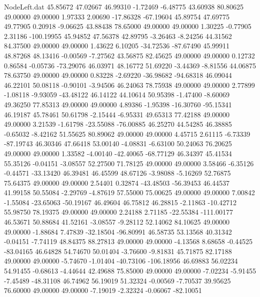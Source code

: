 \begin{filecontents}{NodeLeft.dat}
  45.85672   47.02667   46.99310    -1.72469   -6.48775   43.60938   80.80625   49.00000   49.00000    1.97333    2.00690  -17.86328  -67.19604
  45.89754   47.69775   49.77905     0.20918   -9.06625   43.88438   78.65000   49.00000   49.00000    1.30225   -0.77905    2.31186 -100.19955
  45.94852   47.56378   42.89795    -3.26463   -8.24256   44.31562   84.37500   49.00000   49.00000    1.43622    6.10205  -34.72536  -87.67490
  45.99911   48.87268   48.13416    -0.00569   -7.27562   43.56875   82.45625   49.00000   49.00000    0.12732    0.86584   -0.05736  -73.29076
  46.03971   48.16772   51.69220    -3.44369   -8.81556   44.06875   78.63750   49.00000   49.00000    0.83228   -2.69220  -36.98682  -94.68318
  46.09044   46.22101   50.08118    -0.90101   -3.94506   46.24063   78.75938   49.00000   49.00000    2.77899   -1.08118   -9.93059  -43.48122
  46.14122   44.10614   50.95398    -1.47400   -8.60069   49.36250   77.85313   49.00000   49.00000    4.89386   -1.95398  -16.30760  -95.15341
  46.19187   45.78461   50.61798    -2.15444   -6.95331   49.65313   77.42188   49.00000   49.00000    3.21539   -1.61798  -23.55088  -76.00885
  46.25270   44.54285   46.38885    -0.65032   -8.42162   51.55625   80.89062   49.00000   49.00000    4.45715    2.61115   -6.73339  -87.19743
  46.30346   47.66418   53.00140    -4.08831   -6.63100   50.24063   76.20625   49.00000   49.00000    1.33582   -4.00140  -42.40065  -68.77129
  46.34397   45.41534   55.35126    -0.04151   -3.08557   52.27500   71.78125   49.00000   49.00000    3.58466   -6.35126   -0.44571  -33.13420
  46.39481   46.45599   48.67126    -3.98088   -5.16269   52.76875   75.64375   49.00000   49.00000    2.54401    0.32874  -43.48503  -56.39453
  46.44537   41.99158   50.55084    -2.29769   -4.87619   57.55000   75.00625   49.00000   49.00000    7.00842   -1.55084  -23.65063  -50.19167
  46.49604   46.75812   46.28815    -2.11863  -10.42712   55.98750   78.19375   49.00000   49.00000    2.24188    2.71185  -22.55384 -111.00177
  46.53671   50.88684   41.52161    -3.08557   -9.28112   52.14062   84.10625   49.00000   49.00000   -1.88684    7.47839  -32.18504  -96.80991
  46.58735   53.13568   40.31342    -0.04151   -7.74119   48.84375   88.27813   49.00000   49.00000   -4.13568    8.68658   -0.44525  -83.04165
  46.64828   54.74670   50.01404    -3.76600   -9.81831   45.71875   82.17188   49.00000   49.00000   -5.74670   -1.01404  -40.73106 -106.18956
  46.69883   56.02234   54.91455    -0.68613   -4.44644   42.49688   75.85000   49.00000   49.00000   -7.02234   -5.91455   -7.45489  -48.31108
  46.74962   56.19019   51.32324    -0.00569   -7.70537   39.95625   76.60000   49.00000   49.00000   -7.19019   -2.32324   -0.06067  -82.10051

\end{filecontents}
